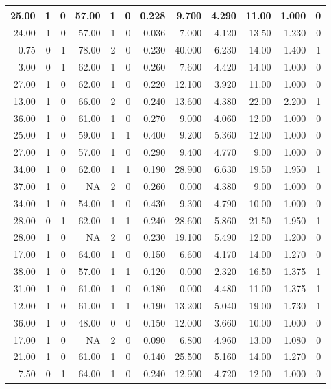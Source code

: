 \documentclass[
]{article}
\begin{document}
\begin{table}
\begin{tabular}[t]{r|r|r|r|r|r|r|r|r|r|r|r}
\hline
25.00 & 1 & 0 & 57.00 & 1 & 0 & 0.228 & 9.700 & 4.290 & 11.00 & 1.000 & 0\\
\hline
24.00 & 1 & 0 & 57.00 & 1 & 0 & 0.036 & 7.000 & 4.120 & 13.50 & 1.230 & 0\\
\hline
0.75 & 0 & 1 & 78.00 & 2 & 0 & 0.230 & 40.000 & 6.230 & 14.00 & 1.400 & 1\\
\hline
3.00 & 0 & 1 & 62.00 & 1 & 0 & 0.260 & 7.600 & 4.420 & 14.00 & 1.000 & 0\\
\hline
27.00 & 1 & 0 & 62.00 & 1 & 0 & 0.220 & 12.100 & 3.920 & 11.00 & 1.000 & 0\\
\hline
13.00 & 1 & 0 & 66.00 & 2 & 0 & 0.240 & 13.600 & 4.380 & 22.00 & 2.200 & 1\\
\hline
36.00 & 1 & 0 & 61.00 & 1 & 0 & 0.270 & 9.000 & 4.060 & 12.00 & 1.000 & 0\\
\hline
25.00 & 1 & 0 & 59.00 & 1 & 1 & 0.400 & 9.200 & 5.360 & 12.00 & 1.000 & 0\\
\hline
27.00 & 1 & 0 & 57.00 & 1 & 0 & 0.290 & 9.400 & 4.770 & 9.00 & 1.000 & 0\\
\hline
34.00 & 1 & 0 & 62.00 & 1 & 1 & 0.190 & 28.900 & 6.630 & 19.50 & 1.950 & 1\\
\hline
37.00 & 1 & 0 & NA & 2 & 0 & 0.260 & 0.000 & 4.380 & 9.00 & 1.000 & 0\\
\hline
34.00 & 1 & 0 & 54.00 & 1 & 0 & 0.430 & 9.300 & 4.790 & 10.00 & 1.000 & 0\\
\hline
28.00 & 0 & 1 & 62.00 & 1 & 1 & 0.240 & 28.600 & 5.860 & 21.50 & 1.950 & 1\\
\hline
28.00 & 1 & 0 & NA & 2 & 0 & 0.230 & 19.100 & 5.490 & 12.00 & 1.200 & 0\\
\hline
17.00 & 1 & 0 & 64.00 & 1 & 0 & 0.150 & 6.600 & 4.170 & 14.00 & 1.270 & 0\\
\hline
38.00 & 1 & 0 & 57.00 & 1 & 1 & 0.120 & 0.000 & 2.320 & 16.50 & 1.375 & 1\\
\hline
31.00 & 1 & 0 & 61.00 & 1 & 0 & 0.180 & 0.000 & 4.480 & 11.00 & 1.375 & 1\\
\hline
12.00 & 1 & 0 & 61.00 & 1 & 1 & 0.190 & 13.200 & 5.040 & 19.00 & 1.730 & 1\\
\hline
36.00 & 1 & 0 & 48.00 & 0 & 0 & 0.150 & 12.000 & 3.660 & 10.00 & 1.000 & 0\\
\hline
17.00 & 1 & 0 & NA & 2 & 0 & 0.090 & 6.800 & 4.960 & 13.00 & 1.080 & 0\\
\hline
21.00 & 1 & 0 & 61.00 & 1 & 0 & 0.140 & 25.500 & 5.160 & 14.00 & 1.270 & 0\\
\hline
7.50 & 0 & 1 & 64.00 & 1 & 0 & 0.240 & 12.900 & 4.720 & 12.00 & 1.000 & 0\\

\end{tabular}
\end{table}
\end{document}
